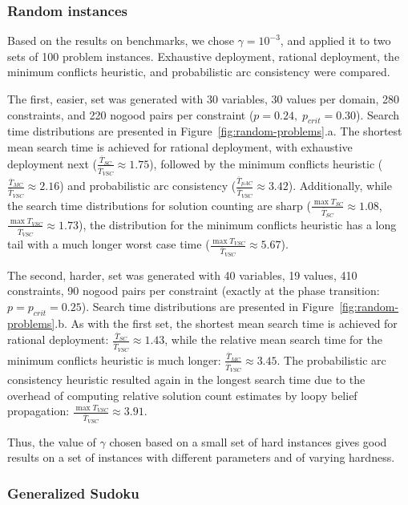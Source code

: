 \subsubsection{Random instances}

Based on the results on benchmarks, we chose $\gamma=10^{-3}$, and
applied it to two sets of 100 problem instances. 
Exhaustive deployment, rational deployment, the
minimum conflicts heuristic, and probabilistic arc consistency
were compared.

The first, easier, set was generated with 30 variables, 30 values per
domain, 280 constraints, and 220 nogood pairs per constraint
($p=0.24,\;p_{crit}=0.30$). Search time distributions are presented in
Figure~\ref{fig:random-problems}.a. The shortest mean search time is
achieved for rational deployment, with exhaustive deployment
next ($\frac {\overline T_{SC}} {\overline T_{VSC}}
\approx 1.75 $), followed by the minimum conflicts heuristic ($\frac
{\overline T_{MC}} {\overline T_{VSC}} \approx 2.16$) and 
probabilistic arc consistency ($\frac {\overline T_{pAC}} {\overline
  T_{VSC}} \approx 3.42$). Additionally,
while the search time distributions for solution counting are sharp
($\frac {\max T_{SC}} {\overline T_{SC}} \approx 1.08$, $\frac {\max
T_{VSC}} {\overline T_{VSC}} \approx 1.73$), the distribution for the
minimum conflicts heuristic has a long tail with a much longer worst
case time ($\frac {\max T_{VSC}} {\overline T_{VSC}} \approx 5.67$).

The second, harder, set was generated with 40 variables, 19 values,
410 constraints, 90 nogood pairs per constraint (exactly at the phase
transition: $p=p_{crit}=0.25$).
Search time distributions are presented in Figure~\ref{fig:random-problems}.b.
As with the first set, the shortest mean search time is achieved for
rational deployment: $\frac {\overline T_{SC}} {\overline T_{VSC}}
\approx 1.43 $,  while the relative mean search time for the minimum
conflicts heuristic is much longer: $\frac {\overline T_{MC}}
{\overline T_{VSC}} \approx 3.45$. The probabilistic arc consistency heuristic
resulted again in the longest search time due to the overhead of computing
relative solution count estimates by loopy belief propagation: $\frac
{\max T_{VSC}} {\overline T_{VSC}} \approx 3.91$. 

Thus, the value of $\gamma$ chosen based on a small set of hard instances
gives good results on a set of instances with different parameters and
of varying hardness.

\subsubsection{Generalized Sudoku}

